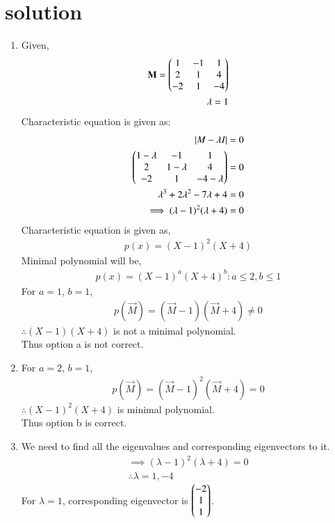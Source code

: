 \documentclass[journal,12pt,twocolumn]{IEEEtran}
\begin{document}
\section{solution}
\begin{enumerate}
\item{Given,
\begin{align}
\mathbf{M}=\begin{pmatrix}1&-1&1\\2&1&4\\-2&1&-4\end{pmatrix}\\
\lambda=1
\end{align}
Characteristic equation is given as:
\begin{align}
\lvert M-\lambda I \rvert =0\\
\begin{pmatrix}1-\lambda&-1 &1\\2&1-\lambda&4\\-2&1&-4-\lambda\end{pmatrix}=0\\
\lambda^3+2\lambda^2-7\lambda+4=0\\
\implies (\lambda-1)^2(\lambda+4)=0
\end{align}
Characteristic equation is given as,
\begin{align}
p(x)=(X-1)^2(X+4)
\end{align}
Minimal polynomial will be,
\begin{align}
p(x)=(X-1)^a(X+4)^b : a \leq 2, b \leq 1
\end{align}
For $a=1$, $b=1$,
\begin{align}
p(\vec{M})=(\vec{M}-1)(\vec{M}+4)\neq0
\end{align}
$\therefore (X-1)(X+4)$ is not a minimal polynomial.\\
Thus option a is not correct.\\}
\item{For $a=2$, $b=1$,
\begin{align}
p(\vec{M})=(\vec{M}-1)^2(\vec{M}+4)=0
\end{align}
$\therefore (X-1)^2(X+4)$ is minimal polynomial.\\
Thus option b is correct.}\\
\item{ We need to find all the eigenvalues and corresponding eigenvectors to it.
\begin{align}
\implies (\lambda-1)^2(\lambda+4)=0\\
\therefore \lambda=1 , -4
\end{align}
 For $\lambda=1$, corresponding eigenvector is $\begin{pmatrix}-2\\1\\1\end{pmatrix}$.\\
}
\end{enumerate}
\end{document}

